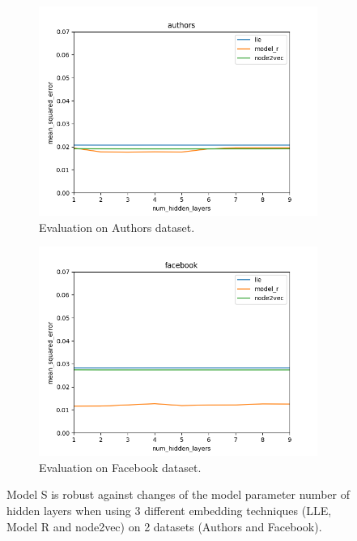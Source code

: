 \documentclass{article} %
\begin{document}
\begin{figure}[h] \centering
	\begin{subfigure}{0.49 \linewidth}
		\includegraphics[width=\linewidth]{authors}
		\caption{Evaluation on Authors dataset.}
		\label{fig:movieLens100K}
	\end{subfigure}
	\begin{subfigure}{0.49 \linewidth}
		\includegraphics[width=\linewidth]{facebook}
		\caption{Evaluation on Facebook dataset.}
		\label{fig:movieLens1M}
	\end{subfigure}
	\caption{
		Model S is robust against changes of the model parameter number of hidden layers when using 3 different embedding techniques (LLE, Model R and node2vec) on 2 datasets (Authors and Facebook).
	}
	\label{fig:robust}
\end{figure}
\end{document}
